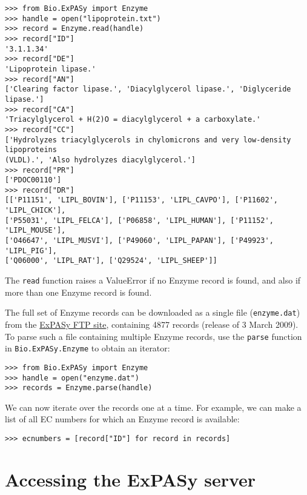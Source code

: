 \documentclass{report}
\begin{document}
\begin{verbatim}
>>> from Bio.ExPASy import Enzyme
>>> handle = open("lipoprotein.txt")
>>> record = Enzyme.read(handle)
>>> record["ID"]
'3.1.1.34'
>>> record["DE"]
'Lipoprotein lipase.'
>>> record["AN"]
['Clearing factor lipase.', 'Diacylglycerol lipase.', 'Diglyceride lipase.']
>>> record["CA"]
'Triacylglycerol + H(2)O = diacylglycerol + a carboxylate.'
>>> record["CC"]
['Hydrolyzes triacylglycerols in chylomicrons and very low-density lipoproteins
(VLDL).', 'Also hydrolyzes diacylglycerol.']
>>> record["PR"]
['PDOC00110']
>>> record["DR"]
[['P11151', 'LIPL_BOVIN'], ['P11153', 'LIPL_CAVPO'], ['P11602', 'LIPL_CHICK'],
['P55031', 'LIPL_FELCA'], ['P06858', 'LIPL_HUMAN'], ['P11152', 'LIPL_MOUSE'],
['O46647', 'LIPL_MUSVI'], ['P49060', 'LIPL_PAPAN'], ['P49923', 'LIPL_PIG'],
['Q06000', 'LIPL_RAT'], ['Q29524', 'LIPL_SHEEP']]
\end{verbatim}
The \verb+read+ function raises a ValueError if no Enzyme record is found, and also if more than one Enzyme record is found.

The full set of Enzyme records can be downloaded as a single file (\verb|enzyme.dat|) from the \href{ftp://ftp.expasy.org/databases/enzyme/enzyme.dat}{ExPASy FTP site}, containing 4877 records (release of 3 March 2009). To parse such a file containing multiple Enzyme records, use the \verb+parse+ function in \verb+Bio.ExPASy.Enzyme+ to obtain an iterator:

\begin{verbatim}
>>> from Bio.ExPASy import Enzyme
>>> handle = open("enzyme.dat")
>>> records = Enzyme.parse(handle)
\end{verbatim}

We can now iterate over the records one at a time. For example, we can make a list of all EC numbers for which an Enzyme record is available:
\begin{verbatim}
>>> ecnumbers = [record["ID"] for record in records]
\end{verbatim}

\section{Accessing the ExPASy server}
\end{document}
